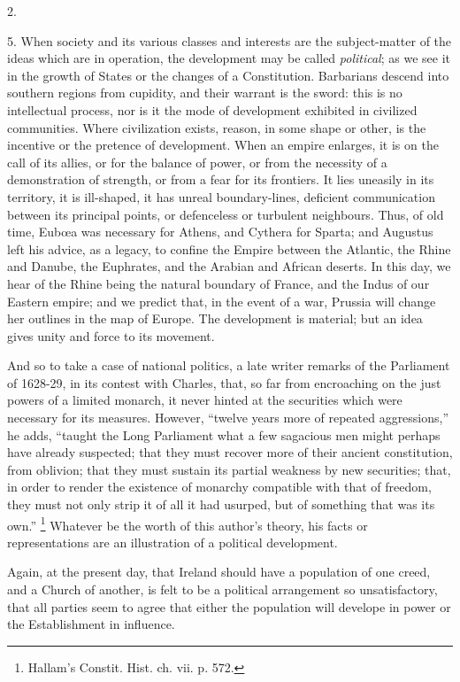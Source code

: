 2.

5. When society and its various classes and interests
are the subject-matter of the ideas which are in
operation, the development may be called \emph{political};
as we see it in the growth of States or the changes of a
Constitution. Barbarians descend into southern regions
from cupidity, and their warrant is the sword: this is no
intellectual process, nor is it the mode of development
exhibited in civilized communities. Where civilization
exists, reason, in some shape or other, is the incentive
or the pretence of development. When an empire enlarges,
it is on the call of its allies, or for the balance of
power, or from the necessity of a demonstration of
strength, or from a fear for its frontiers. It lies
uneasily in its territory, it is ill-shaped, it has
unreal boundary-lines, deficient communication between
its principal points, or defenceless or turbulent
neighbours. Thus, of old time, Eubœa was necessary for
Athens, and Cythera for Sparta; and Augustus left his
advice, as a legacy, to confine the Empire between the
Atlantic, the Rhine and Danube, the Euphrates, and the
Arabian and African deserts. In this day, we hear of the
Rhine being the natural boundary of France, and the Indus
of our Eastern empire; and we predict that, in the event
of a war, Prussia will change her outlines in the map of
Europe. The development is material; but an idea gives
unity and force to its movement.

And so to take a case of national politics, a late
writer remarks of the Parliament of 1628-29, in its
contest with Charles, that, so far from encroaching on
the just powers of a limited monarch, it never hinted at
the securities which were necessary for its measures.
However, ``twelve years more of repeated
aggressions,'' he adds, ``taught the Long
Parliament what a few sagacious men might perhaps have
already suspected; that they must recover more of their
ancient constitution, from oblivion; that they must
sustain its partial weakness by new securities; that, in
order to render the existence of monarchy compatible with
that of freedom, they must not only strip it of all it
had usurped, but of something that was its own.'' \footnote{Hallam's Constit. Hist. ch. vii. p. 572.} Whatever
be the worth of this author's theory, his facts or
representations are an illustration of a political
development.

Again, at the present day, that Ireland should have a
population of one creed, and a Church of another, is felt
to be a political arrangement so unsatisfactory, that all
parties seem to agree that either the population will
develope in power or the Establishment in influence.

